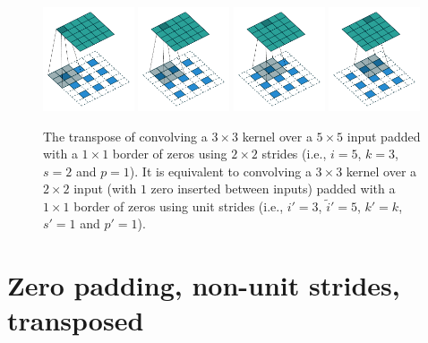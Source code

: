 \documentclass[notitlepage]{report}
\begin{document}
\begin{figure}[p]
    \centering
    \includegraphics[width=0.24\textwidth]{pdf/padding_strides_transposed_00.pdf}
    \includegraphics[width=0.24\textwidth]{pdf/padding_strides_transposed_01.pdf}
    \includegraphics[width=0.24\textwidth]{pdf/padding_strides_transposed_02.pdf}
    \includegraphics[width=0.24\textwidth]{pdf/padding_strides_transposed_03.pdf}
    \caption{\label{fig:padding_strides_transposed} The transpose of convolving
        a $3 \times 3$ kernel over a $5 \times 5$ input padded with a $1 \times
        1$ border of zeros using $2 \times 2$ strides (i.e., $i = 5$, $k = 3$, $s
        = 2$ and $p = 1$). It is equivalent to convolving a $3 \times 3$ kernel
        over a $2 \times 2$ input (with $1$ zero inserted between inputs) padded
        with a $1 \times 1$ border of zeros using unit strides (i.e., $i' = 3$,
        $\tilde{i}' = 5$, $k' = k$, $s' = 1$ and $p' = 1$).}
\end{figure}

\section{Zero padding, non-unit strides, transposed}
\end{document}
